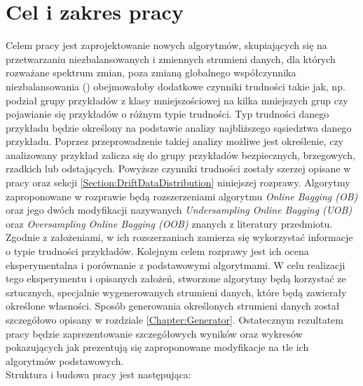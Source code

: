 \chapter{Cel i zakres pracy}

\noindent Celem pracy jest zaprojektowanie nowych algorytmów, skupiających się na przetwarzaniu niezbalansowanych i zmiennych strumieni danych, dla których rozważane spektrum zmian, poza zmianą globalnego współczynnika niezbalansowania () obejmowałoby dodatkowe czynniki trudności takie jak, np. podział grupy przykładów z klasy mniejszościowej na kilka mniejszych grup czy pojawianie się przykładów o różnym typie trudności. Typ trudności danego przykładu będzie określony na podstawie analizy najbliższego sąsiedztwa danego przykładu. Poprzez przeprowadzenie takiej analizy możliwe jest określenie, czy analizowany przykład zalicza się do grupy przykładów bezpiecznych, brzegowych, rzadkich lub odstających. Powyższe czynniki trudności zostały szerzej opisane w pracy \cite{Article:TypyPrzykladow} oraz sekcji \ref{Section:DriftDataDistribution} niniejszej rozprawy. Algorytmy zaproponowane w rozprawie będą rozszerzeniami algorytmu \textit{Online Bagging (OB)} oraz jego dwóch modyfikacji nazywanych \textit{Undersampling Online Bagging (UOB)} oraz \textit{Oversampling Online Bagging (OOB)} znanych z literatury przedmiotu. Zgodnie z założeniami, w ich rozszerzaniach zamierza się wykorzystać informacje o typie trudności przykładów. Kolejnym celem rozprawy jest ich ocena eksperymentalna i porównanie z podstawowymi algorytmami. W celu realizacji tego eksperymentu i opisanych założeń, stworzone algorytmy będą korzystać ze sztucznych, specjalnie wygenerowanych strumieni danych, które będą zawierały określone własności. Sposób generowania określonych strumieni danych został szczegółowo opisany w rozdziale \ref{Chapter:Generator}. Ostatecznym rezultatem pracy będzie zaprezentowanie szczegółowych wyników oraz wykresów pokazujących jak prezentują się zaproponowane modyfikacje na tle ich algorytmów podstawowych.\\

\noindent Struktura i budowa pracy jest następująca:

